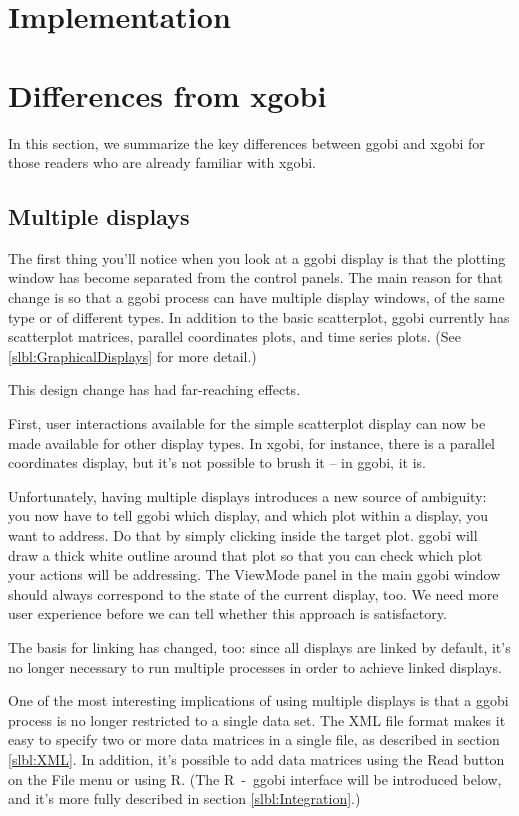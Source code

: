 \documentclass[11pt]{article}
\begin{document}
\section{Implementation}

\section{Differences from xgobi}
\label{slbl:xgobi}

In this section, we summarize the key differences between ggobi
and xgobi for those readers who are already familiar with xgobi.

\subsection {Multiple displays}

The first thing you'll notice when you look at a ggobi display is
that the plotting window has become separated from the control
panels.  The main reason for that change is so that a ggobi process
can have multiple display windows, of the same type or of different
types.  In addition to the basic scatterplot, ggobi currently has
scatterplot matrices, parallel coordinates plots, and time series
plots.  (See \ref{slbl:GraphicalDisplays} for more detail.)

This design change has had far-reaching effects.

First, user interactions available for the simple scatterplot display
can now be made available for other display types.  In xgobi, for
instance, there is a parallel coordinates display, but it's not
possible to brush it -- in ggobi, it is. 

Unfortunately, having multiple displays introduces a new source of
ambiguity: you now have to tell ggobi which display, and which plot
within a display, you want to address.  Do that by simply clicking
inside the target plot.  ggobi will draw a thick white outline around
that plot so that you can check which plot your actions will be
addressing.  The ViewMode panel in the main ggobi window should
always correspond to the state of the current display, too.  We need
more user experience before we can tell whether this approach is
satisfactory.

The basis for linking has changed, too:  since all displays are
linked by default, it's no longer necessary to run multiple processes
in order to achieve linked displays.

One of the most interesting implications of using multiple displays
is that a ggobi process is no longer restricted to a single data
set.  The XML file format makes it easy to specify two or more data
matrices in a single file, as described in section \ref{slbl:XML}.
In addition, it's possible to add data matrices using the Read button
on the File menu or using R.  (The R~-~ggobi interface will be
introduced below, and it's more fully described in section
\ref{slbl:Integration}.)
\end{document}
